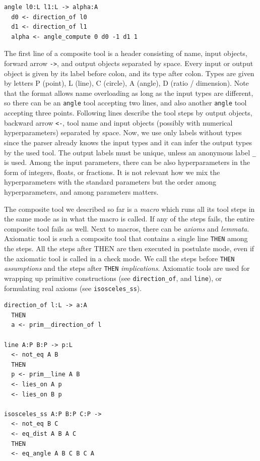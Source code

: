 \documentclass[runningheads]{llncs}
\begin{document}
\begin{verbatim}
angle l0:L l1:L -> alpha:A
  d0 <- direction_of l0
  d1 <- direction_of l1
  alpha <- angle_compute 0 d0 -1 d1 1
\end{verbatim}

The first
line of a composite tool is a header consisting of name, input
objects, forward arrow \texttt{->}, and output objects separated by
space. Every input or output object is given by its label before colon,
and its type after colon. Types are given by letters P (point), L
(line), C (circle), A (angle), D (ratio / dimension). Note that the
format allows name overloading as long as the input types are
different, so there can be an \texttt{angle} tool accepting two lines,
and also another \texttt{angle} tool accepting three points.
Following lines describe the tool steps by output objects, backward
arrow \texttt{<-}, tool name and input objects (possibly with
numerical hyperparameters) separated by
space. Now, we use only labels without types since the parser already knows the
input types and it can infer the output types by the used tool. The
output labels must be unique, unless an anonymous label \texttt{\_} is
used. Among the input parameters, there can be also hyperparameters
in the form of integers, floats, or fractions. It is not relevant how
we mix the hyperparameters with the standard parameters but the order
among hyperparameters, and among parameters matters.

The composite tool we described so far is a \emph{macro} which runs
all its tool steps in the same mode as in what the macro is called. If
any of the steps fails, the entire composite tool fails as well.
Next to macros, there can be \emph{axioms} and \emph{lemmata}.
Axiomatic tool is such a composite tool that contains a single
line \texttt{THEN} among the steps. All the steps after THEN are then
executed in postulate mode, even if the axiomatic tool is called in a
check mode. We call the steps before \texttt{THEN} \emph{assumptions}
and the steps after \texttt{THEN} \emph{implications}.
Axiomatic tools are used for wrapping up primitive
constructions (see \texttt{direction\_of}, and \texttt{line}),
or formulating real axioms (see \texttt{isosceles\_ss}).

\begin{verbatim}
direction_of l:L -> a:A
  THEN
  a <- prim__direction_of l

line A:P B:P -> p:L
  <- not_eq A B
  THEN
  p <- prim__line A B
  <- lies_on A p
  <- lies_on B p

isosceles_ss A:P B:P C:P -> 
  <- not_eq B C
  <- eq_dist A B A C
  THEN
  <- eq_angle A B C B C A
\end{verbatim}
\end{document}
